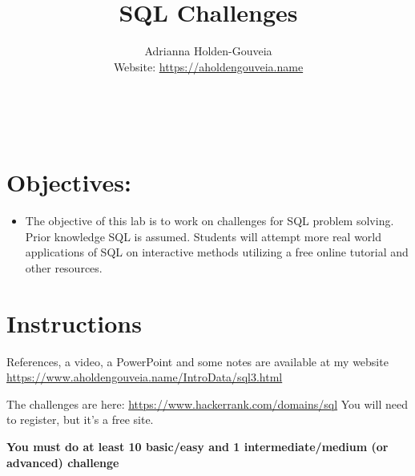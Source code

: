 \documentclass[12pt]{article}
\title{SQL Challenges}
\author{
        Adrianna Holden-Gouveia \\
        Website: \url{https://aholdengouveia.name}\\ 
        \date{\vspace{-5ex}}
        \faLinkedin{: aholdengouveia} \\
        \faGithub {: aholdengouveia} \\
        }
\begin{document}
    

\maketitle


\section*{Objectives:}
\begin{itemize}
    \item The objective of this lab is to work on challenges for SQL problem solving. Prior knowledge SQL is assumed. Students will attempt more real world applications of SQL on interactive methods utilizing a free online tutorial and other resources.
\end{itemize}
\section*{Instructions}

References, a video, a PowerPoint and some notes are available at my website
\url {https://www.aholdengouveia.name/IntroData/sql3.html}

The challenges are here: \url{https://www.hackerrank.com/domains/sql} You will need to register, but it's a free site. 


\textbf{You must do at least 10 basic/easy and 1 intermediate/medium (or advanced) challenge}
\end{document}
